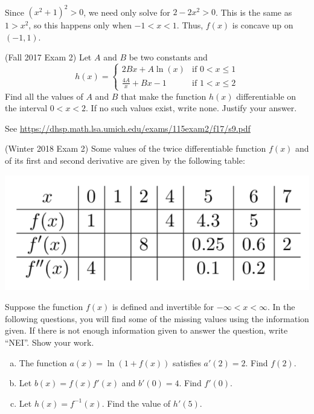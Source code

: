 \documentclass[11pt]{exam}
\begin{document}
\begin{questions}
\begin{solution}
\begin{align*}
    \end{align*}
    Since \((x^2+1)^2 > 0\), we need only solve for \(2-2x^2 >
    0\). This is the same as \(1 > x^2\), so this happens
    only when \(-1 < x < 1\). Thus, \(f(x)\) is concave up on \((-1,1)\).
  \end{solution}
\question (Fall 2017 Exam 2) %
  Let \(A\) and \(B\) be two constants and
$$h(x) = \left\lbrace \begin{array}{ll} \!\! 2Bx + A \ln(x) & \textrm{if } 0 < x \leqslant 1 \\ \!\!\displaystyle\frac{4A}{x} + Bx - 1 & \textrm{if } 1 < x \leqslant 2 \end{array}\right.$$
Find all the values of $A$ and $B$ that make the function $h(x)$ differentiable on the interval $0 < x < 2$. If no such values exist, write none. Justify your answer.
\begin{solution}
  See \href{https://dhsp.math.lsa.umich.edu/exams/115exam2/f17/s9.pdf}{https://dhsp.math.lsa.umich.edu/exams/115exam2/f17/s9.pdf}
\end{solution}
\question (Winter 2018 Exam 2) %
  Some values of the twice differentiable function \(f(x)\) and of its first and second
derivative are given by the following table:
\begin{center}
  \includegraphics[scale=0.6]{Figures/table.png}
\end{center}
Suppose the function $f(x)$ is defined and invertible for $-\infty < x < \infty$. In the following questions, you will find some of the missing values using the information given. If there is not enough information given to answer the question, write “NEI”. Show your work.
\begin{enumerate}[(a)]
	\item The function $a(x) = \ln(1 + f(x))$ satisfies $a'(2) = 2$. Find $f(2)$.
	\item Let $b(x) = f(x) f'(x)$ and $b'(0)=4$. Find $f'(0)$.
	\item Let $h(x) = f^{-1}(x)$. Find the value of $h'(5)$.

\end{enumerate}
\end{questions}
\end{document}
